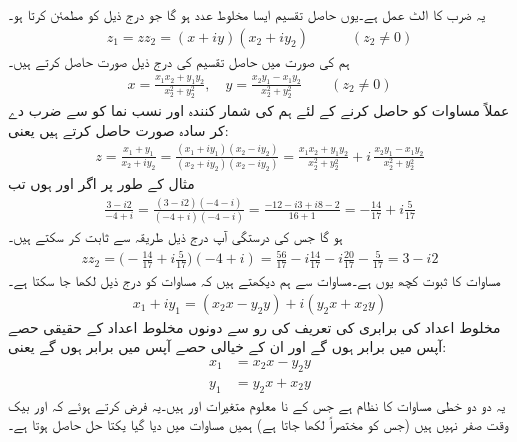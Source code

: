  یہ ضرب کا الٹ عمل ہے۔یوں حاصل تقسیم  ایسا مخلوط عدد  ہو گا جو درج ذیل کو مطمئن کرتا ہو۔
\begin{align}\label{مساوات_مخلوط_عمل_تقسیم}
z_1=zz_2=(x+iy)(x_2+iy_2)\quad \quad \quad (z_2\ne 0)
\end{align} 
ہم  کی صورت میں حاصل تقسیم  کی درج ذیل صورت حاصل کرتے ہیں۔
\begin{align}\label{مساوات_مخلوط_عمل_تقسیم_کلیات_الف}
x=\frac{x_1x_2+y_1y_2}{x_2^2+y_2^2},\quad y=\frac{x_2y_1-x_1y_2}{x_2^2+y_2^2}\quad \quad (z_2\ne 0)
\end{align}
عملاً مساوات  کو حاصل کرنے کے لئے  ہم  کی شمار کنندہ اور نسب نما کو  سے ضرب دے کر سادہ صورت حاصل کرتے ہیں یعنی:
\begin{align}\label{مساوات_مخلوط_عمل_تقسیم_کلیات_ب}
z=\frac{x_1+y_1}{x_2+iy_2}=\frac{(x_1+iy_1)(x_2-iy_2)}{(x_2+iy_2)(x_2-iy_2)}=\frac{x_1x_2+y_1y_2}{x_2^2+y_2^2}+i\,\frac{x_2y_1-x_1y_2}{x_2^2+y_2^2}
\end{align}
مثال کے طور پر اگر  اور  ہوں تب
\begin{align*}
\frac{3-i2}{-4+i}=\frac{(3-i2)(-4-i)}{(-4+i)(-4-i)}=\frac{-12-i3+i8-2}{16+1}=-\frac{14}{17}+i\frac{5}{17}
\end{align*}
ہو گا جس کی درستگی آپ درج ذیل طریقہ سے ثابت کر سکتے ہیں۔
\begin{align*}
zz_2=\big(-\frac{14}{17}+i\frac{5}{17}\big)(-4+i)=\frac{56}{17}-i\frac{14}{17}-i\frac{20}{17}-\frac{5}{17}=3-i2
\end{align*} 
مساوات  کا ثبوت کچھ یوں ہے۔مساوات  سے ہم دیکھتے ہیں کہ مساوات  کو درج ذیل لکھا جا سکتا ہے۔
\begin{align*}
x_1+iy_1=(x_2x-y_2y)+i(y_2x+x_2y)
\end{align*}
مخلوط اعداد کی برابری کی تعریف کی رو سے  دونوں مخلوط اعداد کے حقیقی حصے آپس میں برابر ہوں گے اور ان کے خیالی حصے آپس میں برابر ہوں گے یعنی:
\begin{align*}
x_1&=x_2x-y_2y\\
y_1&=y_2x+x_2y
\end{align*}
یہ دو دو خطی مساوات کا نظام ہے جس کے نا معلوم متغیرات  اور  ہیں۔یہ فرض کرتے ہوئے کہ  اور  بیک وقت صفر نہیں ہیں (جس کو مختصراً  لکھا جاتا ہے) ہمیں مساوات  میں دیا گیا یکتا حل حاصل ہوتا ہے۔

